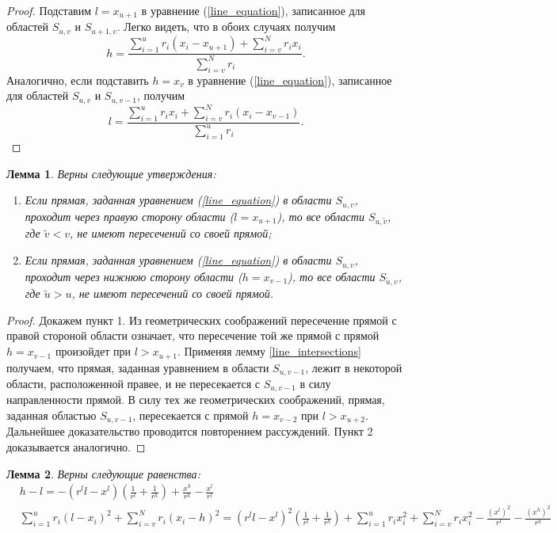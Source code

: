 \documentclass[12pt]{article}
\theoremstyle{definition}
\theoremstyle{plain}
\newtheorem{lemma}{Лемма}
\begin{document}
\begin{proof}
Подставим $l = x_{u+1}$ в уравнение (\ref{line_equation}), записанное для областей
$S_{u,v}$ и $S_{u+1,v}$. Легко видеть, что в обоих случаях получим
$$
h = \frac{\sum_{i = 1}^u r_i (x_i - x_{u+1}) + \sum_{i = v}^N r_i x_i}{\sum_{i = v}^N r_i}.
$$
Аналогично, если подставить $h = x_v$ в уравнение (\ref{line_equation}), записанное для областей
$S_{u,v}$ и $S_{u,v-1}$, получим
$$
l = \frac{\sum_{i = 1}^u r_i x_i + \sum_{i = v}^N r_i (x_i - x_{v-1})}{\sum_{i = 1}^u r_i}.
$$
\end{proof}

\begin{lemma}
\label{not_intersecting_lemma}
Верны следующие утверждения:

\begin{enumerate}
\item Если прямая, заданная уравнением (\ref{line_equation}) в области $S_{u,v}$, проходит
через правую сторону области ($l = x_{u+1}$), то все области
$S_{u, \widetilde{v}}$, где $\widetilde{v} < v$, не имеют пересечений со своей прямой;
\item Если прямая, заданная уравнением (\ref{line_equation}) в области $S_{u,v}$, проходит
через нижнюю сторону области ($h = x_{v-1}$), то все области 
$S_{\widetilde{u}, v}$, где $\widetilde{u} > u$, не имеют пересечений со своей прямой.

\end{enumerate}
\end{lemma}

\begin{proof}
Докажем пункт 1. Из геометрических соображений пересечение прямой с 
правой стороной области означает, что пересечение той же прямой с прямой $h = x_{v-1}$ произойдет
при $l > x_{u+1}$. Применяя лемму \ref{line_intersections} получаем, что прямая, заданная
уравнением в области $S_{u, v-1}$, лежит в некоторой области, расположенной правее, и не 
пересекается с $S_{u, v-1}$ в силу направленности прямой. В силу тех же геометрических 
соображений, прямая, заданная областью $S_{u, v-1}$, пересекается с прямой $h = x_{v-2}$ при
$l > x_{u+2}$. Дальнейшее доказательство проводится повторением рассуждений. 
Пункт 2 доказывается аналогично.
\end{proof}

\begin{lemma}
\label{calculations}
Верны следующие равенства:
\begin{align*}
& h - l = - \left(r^l l - x^l \right) \left(\frac{1}{r^l} + \frac{1}{r^h}\right) +
\frac{x^h}{r^h} - \frac{x^l}{r^l} \\
& \sum_{i = 1}^u r_i (l - x_i)^2 + \sum_{i = v}^N r_i (x_i - h)^2
= \left(r^l l - x^l \right)^2 \left(\frac{1}{r^l} + \frac{1}{r^h}\right) 
+ \sum_{i = 1}^u r_i x_i^2 + \sum_{i = v}^N r_i x_i^2
- \frac{(x^l)^2}{r^l} - \frac{(x^h)^2}{r^h}
\end{align*}
\end{lemma}
\end{document}
